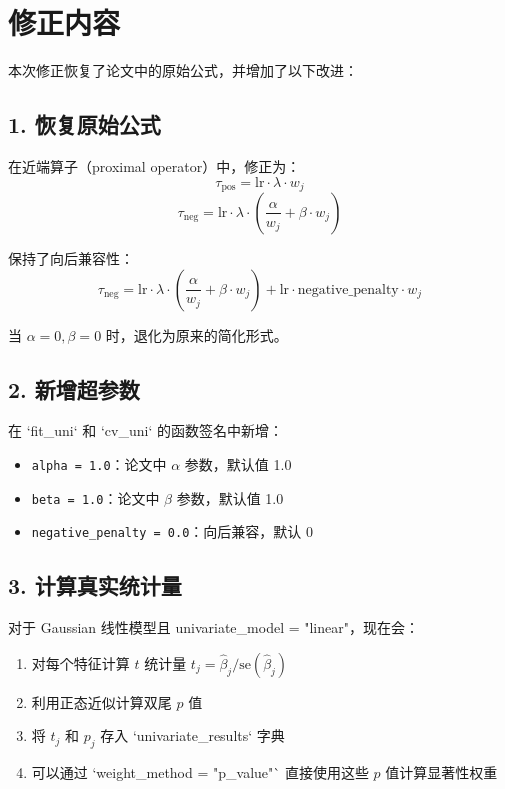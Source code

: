 \documentclass[12pt,a4paper]{article}
\begin{document}
\section{修正内容}

本次修正恢复了论文中的原始公式，并增加了以下改进：

\subsection{1. 恢复原始公式}

在近端算子（proximal operator）中，修正为：
\[
\tau_{\text{pos}} = \text{lr} \cdot \lambda \cdot w_j
\]
\[
\tau_{\text{neg}} = \text{lr} \cdot \lambda \cdot \left( \frac{\alpha}{w_j} + \beta \cdot w_j \right)
\]

保持了向后兼容性：
\[
\tau_{\text{neg}} = \text{lr} \cdot \lambda \cdot \left( \frac{\alpha}{w_j} + \beta \cdot w_j \right) + \text{lr} \cdot \text{negative\_penalty} \cdot w_j
\]

当 $\alpha = 0, \beta = 0$ 时，退化为原来的简化形式。

\subsection{2. 新增超参数}

在 `fit\_uni` 和 `cv\_uni` 的函数签名中新增：
\begin{itemize}
\item \texttt{alpha = 1.0}：论文中 $\alpha$ 参数，默认值 1.0
\item \texttt{beta = 1.0}：论文中 $\beta$ 参数，默认值 1.0
\item \texttt{negative\_penalty = 0.0}：向后兼容，默认 0
\end{itemize}

\subsection{3. 计算真实统计量}

对于 Gaussian 线性模型且 univariate\_model = "linear"，现在会：
\begin{enumerate}
\item 对每个特征计算 $t$ 统计量 $t_j = \hat{\beta}_j / \text{se}(\hat{\beta}_j)$
\item 利用正态近似计算双尾 $p$ 值
\item 将 $t_j$ 和 $p_j$ 存入 `univariate\_results` 字典
\item 可以通过 `weight\_method = "p\_value"` 直接使用这些 $p$ 值计算显著性权重
\end{enumerate}
\end{document}
